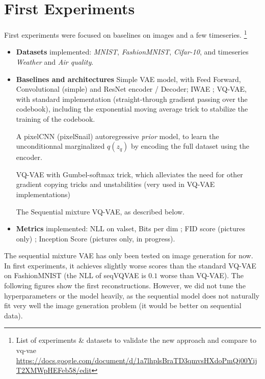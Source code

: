 \documentclass{article}
\title{}
\date{}
\author[$\dag$]{XXX}
\affil[$\dag$]{{\small CMAP, \'Ecole Polytechnique, Institut Polytechnique de Paris, Palaiseau.}}
\begin{document}
\maketitle

\begin{abstract}

\end{abstract}


\section{First Experiments}
First experiments were focused on baselines on images and a few timeseries. \footnote{List of experiments \& datasets to validate the new approach and compare to vq-vae \url{https://docs.google.com/document/d/1a7lhplsBraTD3qmvsHXdoPmQj00YijT2XMWpHEFeb58/edit}}

\begin{itemize}
	\item \textbf{Datasets} implemented: {\em MNIST}, {\em FashionMNIST}, {\em Cifar-10}, and timeseries {\em Weather} and {\em Air quality}.
	\item \textbf{Baselines and architectures} Simple VAE model, with Feed Forward, Convolutional (simple) and ResNet encoder / Decoder; IWAE ; VQ-VAE, with standard implementation (straight-through gradient passing over the codebook), including the exponential moving average trick to stabilize the training of the codebook.

	A pixelCNN (pixelSnail) autoregressive \textit{prior} model, to learn the unconditionnal marginalized $q(z_q)$ by encoding the full dataset using the encoder.

	VQ-VAE with Gumbel-softmax trick, which alleviates the need for other gradient copying tricks and unstabilities (very used in VQ-VAE implementations)

	The Sequential mixture VQ-VAE, as described below.
  \item \textbf{Metrics} implemented: NLL on valset, Bits per dim ; FID score (pictures only) ; Inception Score (pictures only, in progress).
\end{itemize}

The sequential mixture VAE has only been tested on image generation for now. In first experiments, it achieves slightly worse scores than the standard VQ-VAE on FashionMNIST (the NLL of seqVQVAE is $0.1$ worse than VQ-VAE). The following figures show the first reconstructions. However, we did not tune the hyperparameters or the model heavily, as the sequential model does not naturally fit very well the image generation problem (it would be better on sequential data).
\end{document}
